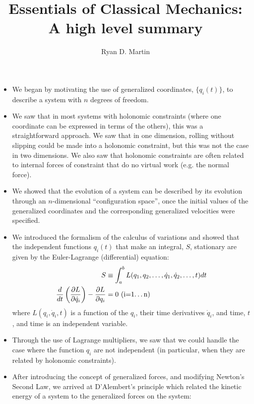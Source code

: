 \documentclass[10pt]{report}
\begin{document}
\title{Essentials of Classical Mechanics: A high level summary}
\author{Ryan D. Martin}
\maketitle

\begin{itemize}

\item We began by motivating the use of generalized coordinates, $\{q_i(t)\}$, to describe a system with $n$ degrees of freedom.
\item We saw that in most systems with holonomic constraints (where one coordinate can be expressed in terms of the others), this was a straightforward approach. We saw that in one dimension, rolling without slipping could be made into a holonomic constraint, but this was not the case in two dimensions. We also saw that holonomic constraints are often related to internal forces of constraint that do no virtual work (e.g. the normal force).
\item We showed that the evolution of a system can be described by its evolution through an $n$-dimensional ``configuration space'', once the initial values of the generalized coordinates and the corresponding generalized velocities were specified.
\item We introduced the formalism of the calculus of variations and showed that the independent functions $q_i(t)$ that make an integral, $S$, stationary are given by the Euler-Lagrange (differential) equation:
\begin{align*}
S&\equiv\int_a^b L(q_1,q_2,\dots,\dot{q}_1, \dot{q}_2,\dots,t)dt\\
\frac{d}{dt}\left(\frac{\partial L}{\partial \dot{q}_i}\right)-\frac{\partial L}{\partial q_i}&=0 \text{              (i=1\dots n)}
\end{align*}
where $L(q_i,\dot q_i,t)$ is a function of the $q_i$, their time derivatives $\dot q_i$, and time, $t$, and time is an independent variable.
\item Through the use of Lagrange multipliers, we saw that we could handle the case where the function $q_i$ are not independent (in particular, when they are related by holonomic constraints).
\item After introducing the concept of generalized forces,  and modifying Newton's Second Law, we arrived at D'Alembert's principle which related the kinetic energy of a system to the generalized forces on the system:
\begin{align*}

\end{align*}
\end{itemize}
\end{document}
